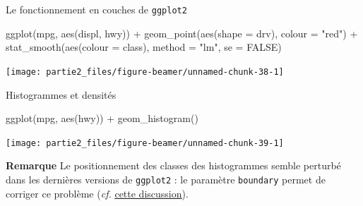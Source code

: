 \documentclass[12pt,ignorenonframetext,]{beamer}
\newenvironment{Shaded}{}{}
\newcommand{\DataTypeTok}[1]{#1}
\newcommand{\KeywordTok}[1]{\textcolor[rgb]{0.00,0.00,1.00}{#1}}
\newcommand{\NormalTok}[1]{#1}
\newcommand{\OperatorTok}[1]{#1}
\newcommand{\OtherTok}[1]{\textcolor[rgb]{1.00,0.25,0.00}{#1}}
\newcommand{\StringTok}[1]{\textcolor[rgb]{0.00,0.50,0.50}{#1}}
\renewenvironment{Shaded}{\begin{snugshade}}{\end{snugshade}}
\newcommand{\intertitre}[1]{\textcolor{redInsee}{\textbf{#1}}}
\begin{document}
\begin{frame}[fragile]{\large Le fonctionnement en \og couches \fg{} de
\texttt{ggplot2}}
\protect\hypertarget{le-fonctionnement-en-couches-de-ggplot2-7}{}

\footnotesize \center

\begin{Shaded}
\begin{Highlighting}[]
\KeywordTok{ggplot}\NormalTok{(mpg, }\KeywordTok{aes}\NormalTok{(displ, hwy)) }\OperatorTok{+}\StringTok{ }
\StringTok{  }\KeywordTok{geom_point}\NormalTok{(}\KeywordTok{aes}\NormalTok{(}\DataTypeTok{shape =}\NormalTok{ drv), }\DataTypeTok{colour =} \StringTok{"red"}\NormalTok{) }\OperatorTok{+}\StringTok{ }
\StringTok{  }\KeywordTok{stat_smooth}\NormalTok{(}\KeywordTok{aes}\NormalTok{(}\DataTypeTok{colour =}\NormalTok{ class), }\DataTypeTok{method =} \StringTok{"lm"}\NormalTok{, }\DataTypeTok{se =} \OtherTok{FALSE}\NormalTok{)}
\end{Highlighting}
\end{Shaded}

\texttt{[image: partie2\_files/figure-beamer/unnamed-chunk-38-1]}

\end{frame}

\begin{frame}[fragile]{Histogrammes et densités}
\protect\hypertarget{histogrammes-et-densites-3}{}

\footnotesize \center

\vspace{-0.3cm}

\begin{Shaded}
\begin{Highlighting}[]
\KeywordTok{ggplot}\NormalTok{(mpg, }\KeywordTok{aes}\NormalTok{(hwy)) }\OperatorTok{+}\StringTok{ }\KeywordTok{geom_histogram}\NormalTok{()}
\end{Highlighting}
\end{Shaded}

\texttt{[image: partie2\_files/figure-beamer/unnamed-chunk-39-1]}

\pause \raggedright \small \vspace{-0.3cm}

\intertitre{Remarque} Le positionnement des classes des histogrammes
semble perturbé dans les dernières versions de \texttt{ggplot2} : le
paramètre \texttt{boundary} permet de corriger ce problème (\emph{cf.}
\href{http://stackoverflow.com/questions/37876096/geom-histogram-wrong-bins}{\underline{cette discussion}}).

\end{frame}
\end{document}

